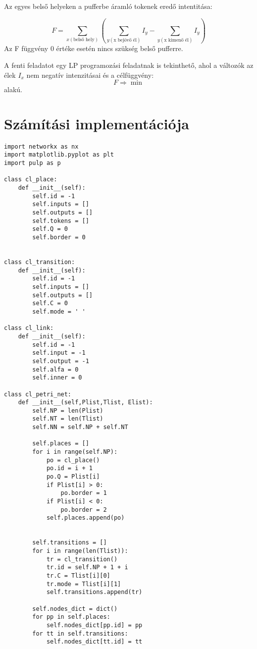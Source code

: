 \documentclass[12pt,a4paper]{book}
\begin{document}
Az egyes belső helyeken a pufferbe áramló tokenek  eredő intentitása:

$$F= \sum_{x(\text{belső hely})} \left( \sum_{y(\text{x bejövő él})} I_y - \sum_{y(\text{x kimenő él})} I_y \right)$$
Az F függvény 0 értéke esetén nincs szükség belső pufferre.

A fenti feladatot egy LP programozási feladatnak is tekinthető, ahol a változók az élek $I_x$ nem negatív intenzitásai és a célfüggvény:
$$F\Rightarrow \min$$ alakú.

\section{Számítási implementációja}
\begin{verbatim}
import networkx as nx
import matplotlib.pyplot as plt
import pulp as p

class cl_place:
    def __init__(self):
        self.id = -1
        self.inputs = []
        self.outputs = []
        self.tokens = []
        self.Q = 0
        self.border = 0


class cl_transition:
    def __init__(self):
        self.id = -1
        self.inputs = []
        self.outputs = []
        self.C = 0
        self.mode = ' '

class cl_link:
    def __init__(self):
        self.id = -1
        self.input = -1
        self.output = -1
        self.alfa = 0
        self.inner = 0

class cl_petri_net:
    def __init__(self,Plist,Tlist, Elist):
        self.NP = len(Plist)
        self.NT = len(Tlist)
        self.NN = self.NP + self.NT
            
        self.places = []
        for i in range(self.NP):
            po = cl_place()
            po.id = i + 1
            po.Q = Plist[i]
            if Plist[i] > 0:
                po.border = 1
            if Plist[i] < 0:
                po.border = 2            
            self.places.append(po)
            
       
        self.transitions = []
        for i in range(len(Tlist)):
            tr = cl_transition()
            tr.id = self.NP + 1 + i
            tr.C = Tlist[i][0]
            tr.mode = Tlist[i][1]
            self.transitions.append(tr)
        
        self.nodes_dict = dict()
        for pp in self.places:
            self.nodes_dict[pp.id] = pp
        for tt in self.transitions:
            self.nodes_dict[tt.id] = tt
        

\end{verbatim}
\end{document}
